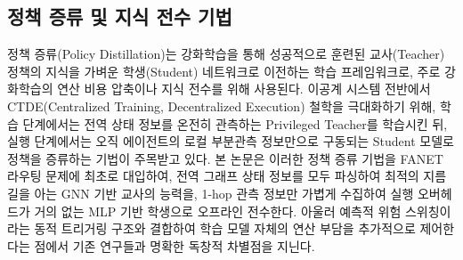 \subsection{정책 증류 및 지식 전수 기법}
정책 증류(Policy Distillation)\cite{rusu2016policy}는 강화학습을 통해 성공적으로 훈련된 교사(Teacher) 정책의 지식을 가벼운 학생(Student) 네트워크로 이전하는 학습 프레임워크로, 주로 강화학습의 연산 비용 압축이나 지식 전수를 위해 사용된다. 이공계 시스템 전반에서 CTDE(Centralized Training, Decentralized Execution) 철학을 극대화하기 위해, 학습 단계에서는 전역 상태 정보를 온전히 관측하는 Privileged Teacher를 학습시킨 뒤, 실행 단계에서는 오직 에이전트의 로컬 부분관측 정보만으로 구동되는 Student 모델로 정책을 증류하는 기법이 주목받고 있다. 
본 논문은 이러한 정책 증류 기법을 FANET 라우팅 문제에 최초로 대입하여, 전역 그래프 상태 정보를 모두 파싱하여 최적의 지름길을 아는 GNN 기반 교사의 능력을, 1-hop 관측 정보만 가볍게 수집하여 실행 오버헤드가 거의 없는 MLP 기반 학생으로 오프라인 전수한다. 아울러 예측적 위험 스위칭이라는 동적 트리거링 구조와 결합하여 학습 모델 자체의 연산 부담을 추가적으로 제어한다는 점에서 기존 연구들과 명확한 독창적 차별점을 지닌다.
